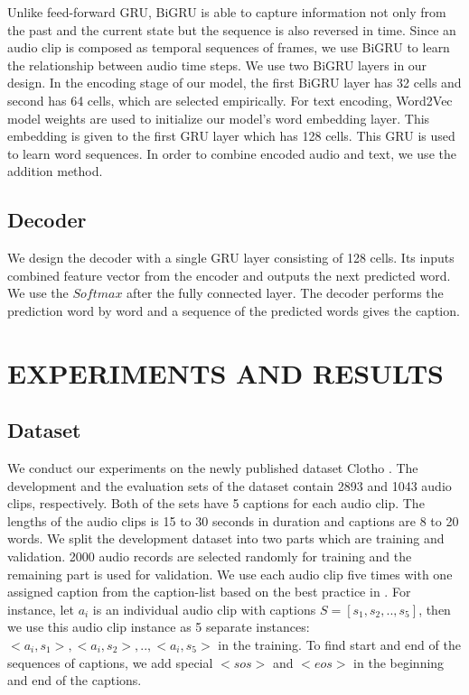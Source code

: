 \documentclass{article}
\begin{document}
Unlike feed-forward GRU, BiGRU is able to capture information not only from the past and the current state but the sequence is also reversed in time. Since an audio clip is composed as temporal sequences of frames, we use BiGRU to learn the relationship between audio time steps. We use two BiGRU layers in our design. In the encoding stage of our model, the first BiGRU layer has 32 cells and second has 64 cells, which are selected empirically. For text encoding, Word2Vec model weights are used to initialize our model’s word embedding layer. This embedding is given to the first GRU layer which has 128 cells. This GRU is used to learn word sequences. In order to combine encoded audio and text, we use the addition method.

\subsection{Decoder}

We design the decoder with a single GRU layer consisting of 128 cells. Its inputs combined feature vector from the encoder and outputs the next predicted word. We use the $Softmax$ after the fully connected layer. The decoder performs the prediction word by word and a sequence of the predicted words gives the caption.

\section{EXPERIMENTS AND RESULTS}
\subsection{Dataset}

We conduct our experiments on the newly published dataset Clotho \cite{Drossos_2020}. The development and the evaluation sets of the dataset contain 2893 and 1043 audio clips, respectively. Both of the sets have 5 captions for each audio clip. The lengths of the audio clips is 15 to 30 seconds in duration and captions are 8 to 20 words. We split the development dataset into two parts which are training and validation. 2000 audio records are selected randomly for training and the remaining part is used for validation. We use each audio clip five times with one assigned caption from the caption-list based on the best practice in \cite{Drossos_2020}. For instance, let $a_i$ is an individual audio clip with captions  $S={[s_1,s_2,..,s_5]}$, then we use this audio clip instance as 5 separate instances: $<a_i,s_1>, <a_i,s_2>, .., <a_i,s_5>$ in the training. To find start and end of the sequences of captions, we add special $<sos>$ and $<eos>$ in the beginning and end of the captions.
\end{document}
